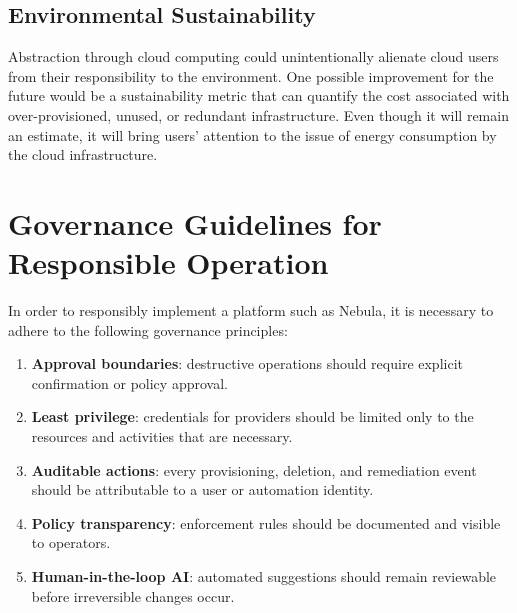 \subsection{Environmental Sustainability}
Abstraction through cloud computing could unintentionally alienate cloud users from their responsibility to the environment. One possible improvement for the future would be a sustainability metric that can quantify the cost associated with over-provisioned, unused, or redundant infrastructure. Even though it will remain an estimate, it will bring users' attention to the issue of energy consumption by the cloud infrastructure.

\section{Governance Guidelines for Responsible Operation}
In order to responsibly implement a platform such as Nebula, it is necessary to adhere to the following governance principles:
\begin{enumerate}
    \item \textbf{Approval boundaries}: destructive operations should require explicit confirmation or policy approval.
    \item \textbf{Least privilege}:  credentials for providers should be limited only to the resources and activities that are necessary.
    \item \textbf{Auditable actions}: every provisioning, deletion, and remediation event should be attributable to a user or automation identity.
    \item \textbf{Policy transparency}: enforcement rules should be documented and visible to operators.
    \item \textbf{Human-in-the-loop AI}: automated suggestions should remain reviewable before irreversible changes occur.
\end{enumerate}

\newpage

